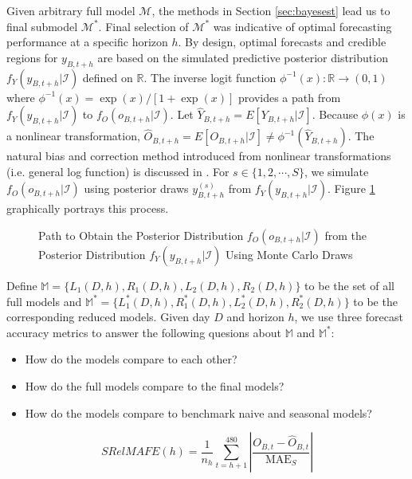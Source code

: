 Given arbitrary full model  $\mathcal{M}$, the methods in Section \ref{sec:bayesest} lead us to final submodel $\mathcal{M}^*$. Final selection of $\mathcal{M}^*$ was indicative of optimal forecasting performance at a specific horizon $h$. By design, optimal forecasts and credible regions for $y_{B,t+h}$ are based on the simulated predictive posterior distribution $f_Y(y_{B,t+h}|\mathcal{I})$ defined on $\mathbb{R}$. The inverse logit function $\phi^{-1}(x):\mathbb{R}\to (0,1)$ where $\phi^{-1}(x)=\exp(x)/[1+\exp(x)]$ provides a path from $f_Y(y_{B,t+h}|\mathcal{I})$ to $f_O(o_{B,t+h}|\mathcal{I})$. Let $\widehat{Y}_{B,t+h}=E[Y_{B,t+h}|\mathcal{I}]$. Because $\phi(x)$ is a nonlinear transformation, $\widehat{O}_{B,t+h}=E[O_{B,t+h}|\mathcal{I}] \neq \phi^{-1}(\widehat{Y}_{B,t+h})$. The natural bias and correction method introduced from nonlinear transformations (i.e. general log function) is discussed in \cite{Metcalfe2009}. For $s \in \{1,2,\cdots, S\}$, we simulate $f_O(o_{B,t+h}|\mathcal{I})$ using posterior draws $y^{(s)}_{B,t+h}$ from $f_Y(y_{B,t+h}|\mathcal{I})$. Figure \ref{fig:posttrans} graphically portrays this process.

\begin{figure}[!h]
\label{fig:posttrans}
\caption{Path to Obtain the Posterior Distribution $f_O(o_{B,t+h}|\mathcal{I})$ from the Posterior Distribution  $f_Y(y_{B,t+h}|\mathcal{I})$ Using Monte Carlo Draws}
\centering
{}
\end{figure}



Define $\mathbb{M}=\{L_1(D,h), R_1(D,h), L_2(D,h), R_2(D,h)\}$ to be the set of all full models and $\mathbb{M}^*=\{L^*_1(D,h), R^*_1(D,h), L^*_2(D,h), R^*_2(D,h)\}$ to be the corresponding reduced models. Given day $D$ and horizon $h$, we use three forecast accuracy metrics to answer the following quesions about $\mathbb{M}$ and $\mathbb{M}^*$:    
\begin{itemize}
   \item How do the models compare to each other?
   \item How do the full models compare to the final models?
   \item How do the models compare to benchmark naive and seasonal models?
 \end{itemize}


\begin{equation}
\label{eq:srelmafe}
  SRelMAFE(h)=\frac{1}{n_h}\sum\limits_{t=h+1}^{480}\left|\frac{O_{B,t}-\widehat{O}_{B,t}}{\textrm{MAE}_{S}}\right|
\end{equation}



